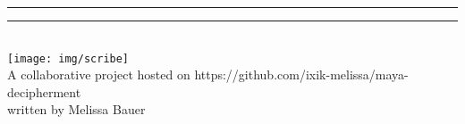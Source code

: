 \documentclass[../main.tex]{subfiles}
\begin{document}
\begin{center}
	\noindent\rule[1ex]{\textwidth}{1pt}
	\Large{\textsf{\worktitle}}
	\noindent\rule[1ex]{\textwidth}{1pt}
	\vspace{2em}	
	\\
	\texttt{[image: img/scribe]}
	\\
	A collaborative project hosted on
	https://github.com/ixik-melissa/maya-decipherment\\
	written by Melissa Bauer
	\vspace{2em}
	\\
\end{center}
\begin{flushright}
	\documentversionlongcount \documentversiontzolkin \documentversionhaab
	\\
	\documentversiongregoriandate{}
\end{flushright}

\clearpage 
\thispagestyle{empty}
\section*{}

\end{document}
